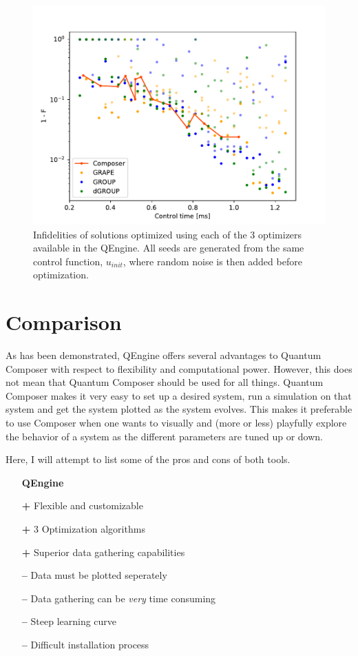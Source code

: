 \documentclass[a4paper, twocolumn]{revtex4-1}
\begin{document}
\begin{figure}
	\includegraphics[width=\columnwidth]{graphics/qengine/noiseDemoInf.pdf}
	\caption{Infidelities of solutions optimized using each of the 3 optimizers available in the QEngine. All seeds are generated from the same control function, $u_{init}$, where random noise is then added before optimization. }
	\label{fig:QEngine_noise}
\end{figure}

\section{Comparison}\label{sec:comparison}
As has been demonstrated, QEngine offers several advantages to Quantum Composer with respect to flexibility and computational power. However, this does not mean that Quantum Composer should be used for all things. Quantum Composer makes it very easy to set up a desired system, run a simulation on that system and get the system plotted as the system evolves. This makes it preferable to use Composer when one wants to visually and (more or less) playfully explore the behavior of a system as the different parameters are tuned up or down.

Here, I will attempt to list some of the pros and cons of both tools.
\begin{itemize}
	\item[] \textbf{QEngine} 
	\item[\bf+] Flexible and customizable
	\item[\bf+] 3 Optimization algorithms
	\item[\bf+] Superior data gathering capabilities
	\item[\bf{--}] Data must be plotted seperately
	\item[\bf{--}] Data gathering can be \textit{very} time consuming
	\item[\bf{--}] Steep learning curve
	\item[\bf{--}] Difficult installation process
\end{itemize}
\end{document}
